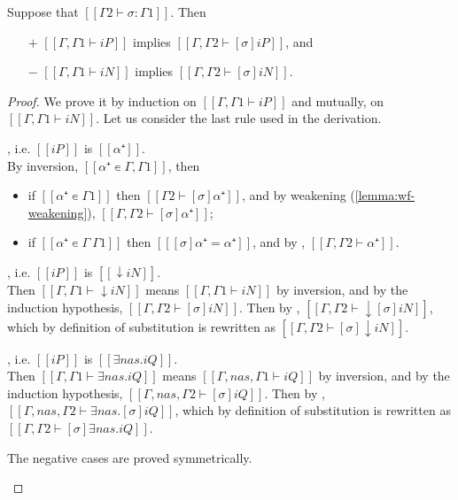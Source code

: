 \begin{lemma}
  \label{lemma:wf-subst}
  Suppose that $[[Γ2 ⊢ σ : Γ1]]$. Then
  \begin{itemize}
  \item[$+$] $[[Γ, Γ1 ⊢ iP]]$ implies $[[Γ, Γ2 ⊢ [σ]iP]]$, and
  \item[$-$] $[[Γ, Γ1 ⊢ iN]]$ implies $[[Γ, Γ2 ⊢ [σ]iN]]$.
  \end{itemize}
\end{lemma}
\begin{proof}
  We prove it by induction on $[[Γ, Γ1 ⊢ iP]]$ and mutually, on $[[Γ, Γ1 ⊢ iN]]$.
  Let us consider the last rule used in the derivation.
  \begin{caseof}
    \item {}, 
      i.e. $[[iP]]$ is $[[α⁺]]$.\\
      By inversion, $[[α⁺ ∊ {Γ, Γ1}]]$, then
      \begin{itemize}
        \item if $[[α⁺ ∊ Γ1]]$ then $[[ Γ2 ⊢ [σ]α⁺ ]]$, 
          and by weakening (\cref{lemma:wf-weakening}),
          $[[ Γ, Γ2 ⊢ [σ]α⁺ ]]$;
        \item if $[[α⁺ ∊ Γ \ Γ1]]$ then $[[ [σ]α⁺ = α⁺ ]]$,
          and by , $[[ Γ, Γ2 ⊢ α⁺ ]]$.
      \end{itemize}

    \item {},
      i.e. $[[iP]]$ is $[[↓iN]]$.\\
      Then $[[Γ, Γ1 ⊢ ↓iN]]$ means $[[Γ, Γ1 ⊢ iN]]$ by inversion,
      and by the induction hypothesis, $[[Γ, Γ2 ⊢ [σ]iN]]$.
      Then by  , $[[Γ, Γ2 ⊢ ↓[σ]iN]]$, 
      which by definition of substitution is rewritten as $[[Γ, Γ2 ⊢ [σ]↓iN]]$.

    \item {},
      i.e. $[[iP]]$ is $[[∃nas.iQ]]$.\\
      Then $[[Γ, Γ1 ⊢ ∃nas.iQ]]$ means $[[Γ, nas, Γ1 ⊢ iQ]]$ 
      by inversion, and by the induction hypothesis, 
      $[[Γ, {nas}, Γ2 ⊢ [σ]iQ]]$.
      Then by  , 
      $[[Γ, {nas}, Γ2 ⊢ ∃nas.[σ]iQ]]$, 
      which by definition of substitution is rewritten as 
      $[[Γ, Γ2 ⊢ [σ]∃nas.iQ]]$.

    \item The negative cases are proved symmetrically.
  \end{caseof}
\end{proof}
